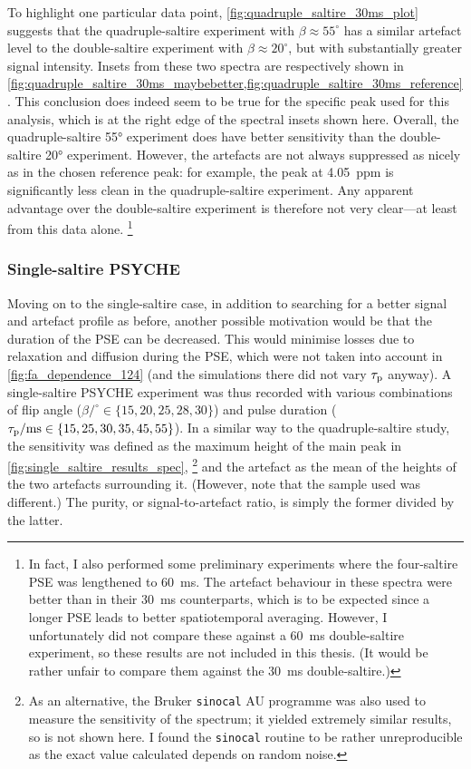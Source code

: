 To highlight one particular data point, \cref{fig:quadruple_saltire_30ms_plot} suggests that the quadruple-saltire experiment with $\beta \approx 55^\circ$ has a similar artefact level to the double-saltire experiment with $\beta \approx 20^\circ$, but with substantially greater signal intensity.
Insets from these two spectra are respectively shown in \cref{fig:quadruple_saltire_30ms_maybebetter,fig:quadruple_saltire_30ms_reference}.
This conclusion does indeed seem to be true for the specific peak used for this analysis, which is at the right edge of the spectral insets shown here.
Overall, the quadruple-saltire \ang{55} experiment does have better sensitivity than the double-saltire \ang{20} experiment.
However, the artefacts are not always suppressed as nicely as in the chosen reference peak: for example, the peak at \qty{4.05}{ppm} is significantly less clean in the quadruple-saltire experiment.
Any apparent advantage over the double-saltire experiment is therefore not very clear---at least from this data alone.%
\footnote{In fact, I also performed some preliminary experiments where the four-saltire PSE was lengthened to \qty{60}{\ms}. The artefact behaviour in these spectra were better than in their \qty{30}{\ms} counterparts, which is to be expected since a longer PSE leads to better spatiotemporal averaging. However, I unfortunately did not compare these against a \qty{60}{\ms} double-saltire experiment, so these results are not included in this thesis. (It would be rather unfair to compare them against the \qty{30}{\ms} double-saltire.)}

\subsubsection{Single-saltire PSYCHE}

Moving on to the single-saltire case, in addition to searching for a better signal and artefact profile as before, another possible motivation would be that the duration of the PSE can be decreased.
This would minimise losses due to relaxation and diffusion during the PSE, which were not taken into account in \cref{fig:fa_dependence_124} (and the simulations there did not vary $\tau_\mathrm{p}$ anyway).
A single-saltire PSYCHE experiment was thus recorded with various combinations of flip angle ($\beta/^\circ \in \{15, 20, 25, 28, 30\}$) and pulse duration ($\tau_\mathrm{p}/\text{ms} \in \{15, 25, 30, 35, 45, 55\}$).
In a similar way to the quadruple-saltire study, the sensitivity was defined as the maximum height of the main peak in \cref{fig:single_saltire_results_spec},%
\footnote{As an alternative, the Bruker \texttt{sinocal} AU programme was also used to measure the sensitivity of the spectrum; it yielded extremely similar results, so is not shown here. I found the \texttt{sinocal} routine to be rather unreproducible as the exact value calculated depends on random noise.}
and the artefact as the mean of the heights of the two artefacts surrounding it.
(However, note that the sample used was different.)
The purity, or signal-to-artefact ratio, is simply the former divided by the latter.


